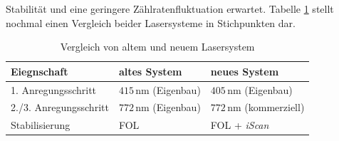 Stabilität und eine geringere Zählratenfluktuation erwartet. Tabelle
\ref{tab:vergleich_alt_neu} stellt nochmal einen Vergleich beider Lasersysteme
in Stichpunkten dar.
\begin{table}
	\begin{tabular}{p{}|p{}p{}}
		\toprule
		Eiegnschaft & altes System & neues System\\
		\midrule[1px]
		\hline
		1. Anregungsschritt & $415\,$nm (Eigenbau) & $405\,$nm (Eigenbau)\\
		2./3. Anregungsschritt & $772\,$nm (Eigenbau) & $772\,$nm (kommerziell)\\
		Stabilisierung & FOL & FOL +
		\textit{iScan}\\
		\bottomrule[1px]
	\end{tabular}
	\caption[Vergleich von altem und
	neuem Lasersystem]{Vergleich von altem und
	neuem Lasersystem}
	\label{tab:vergleich_alt_neu}
\end{table}
